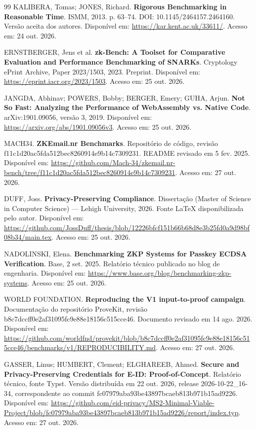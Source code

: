 \begin{thebibliography}{99}
KALIBERA, Tomas; JONES, Richard. \textbf{Rigorous Benchmarking in Reasonable Time}. ISMM, 2013. p. 63--74. DOI: 10.1145/2464157.2464160. Versão aceita dos autores. Disponível em: \url{https://kar.kent.ac.uk/33611/}. Acesso em: 24 out. 2026.

ERNSTBERGER, Jens et al. \textbf{zk-Bench: A Toolset for Comparative Evaluation and Performance Benchmarking of SNARKs}. Cryptology ePrint Archive, Paper 2023/1503, 2023. Preprint. Disponível em: \url{https://eprint.iacr.org/2023/1503}. Acesso em: 25 out. 2026.

JANGDA, Abhinav; POWERS, Bobby; BERGER, Emery; GUHA, Arjun. \textbf{Not So Fast: Analyzing the Performance of WebAssembly vs. Native Code}. arXiv:1901.09056, versão 3, 2019. Disponível em: \url{https://arxiv.org/abs/1901.09056v3}. Acesso em: 25 out. 2026.

MACH34. \textbf{ZKEmail.nr Benchmarks}. Repositório de código, revisão f11c1d20ac5fda512bec8260914e9b14c7309231. README revisado em 5 fev. 2025. Disponível em: \url{https://github.com/Mach-34/zkemail.nr-bench/tree/f11c1d20ac5fda512bec8260914e9b14c7309231}. Acesso em: 27 out. 2026.

DUFF, Joss. \textbf{Privacy-Preserving Compliance}. Dissertação (Master of Science in Computer Science) — Lehigh University, 2026. Fonte LaTeX disponibilizada pelo autor. Disponível em: \url{https://github.com/JossDuff/thesis/blob/12226bfcf151b66b68d8e3b25fd0a9d98bf08b34/main.tex}. Acesso em: 25 out. 2026.

NADOLINSKI, Elena. \textbf{Benchmarking ZKP Systems for Passkey ECDSA Verification}. Base, 2 set. 2025. Relatório técnico publicado no blog de engenharia. Disponível em: \url{https://www.base.org/blog/benchmarking-zkp-systems}. Acesso em: 25 out. 2026.

WORLD FOUNDATION. \textbf{Reproducing the V1 input-to-proof campaign}. Documentação do repositório ProveKit, revisão b8c7dccff0e2af31095fc9e88e18156c515cce46. Documento revisado em 14 ago. 2026. Disponível em: \url{https://github.com/worldfnd/provekit/blob/b8c7dccff0e2af31095fc9e88e18156c515cce46/benchmarks/v1/REPRODUCIBILITY.md}. Acesso em: 27 out. 2026.

GASSER, Linus; HUMBERT, Clement; ELGHAREEB, Ahmed. \textbf{Secure and Privacy-Preserving Credentials for E-ID: Proof-of-Concept}. Relatório técnico, fonte Typst. Versão distribuída em 22 out. 2026, release 2026-10-22\_16-34, correspondente ao commit fc07979aba93be43897bcaeb813b971b15ad9226. Disponível em: \url{https://github.com/eid-privacy/MS2-Minimal-Viable-Project/blob/fc07979aba93be43897bcaeb813b971b15ad9226/report/index.typ}. Acesso em: 27 out. 2026.


\end{thebibliography}
